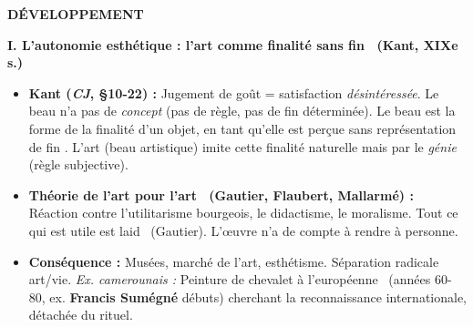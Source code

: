 \documentclass[11pt]{article}
\begin{document}
\begin{corrige}
\textbf{DÉVELOPPEMENT}

\textbf{I. L'autonomie esthétique : l'art comme \guillemotleft finalité sans fin \guillemotright\ (Kant, XIXe s.)}
\begin{itemize}
\item \textbf{Kant (\emph{CJ}, §10-22) :} Jugement de goût = satisfaction \emph{désintéressée}. Le beau n'a pas de \emph{concept} (pas de règle, pas de fin déterminée). \guillemotleft Le beau est la forme de la finalité d'un objet, en tant qu'elle est perçue sans représentation de fin \guillemotright. L'art (beau artistique) imite cette finalité naturelle mais par le \emph{génie} (règle subjective).
\item \textbf{Théorie de l'\guillemotleft art pour l'art \guillemotright\ (Gautier, Flaubert, Mallarmé) :} Réaction contre l'utilitarisme bourgeois, le didactisme, le moralisme. \guillemotleft Tout ce qui est utile est laid \guillemotright\ (Gautier). L'œuvre n'a de compte à rendre à personne.
\item \textbf{Conséquence :} Musées, marché de l'art, esthétisme. Séparation radicale art/vie. \emph{Ex. camerounais :} Peinture de chevalet \guillemotleft à l'européenne \guillemotright\ (années 60-80, ex. \textbf{Francis Sumégné} débuts) cherchant la reconnaissance internationale, détachée du rituel.
\end{itemize}


\end{corrige}
\end{document}
